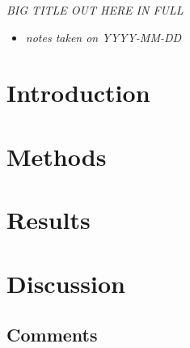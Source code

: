 \documentclass[
]{book}
\providecommand{\tightlist}{%
  \setlength{\itemsep}{0pt}\setlength{\parskip}{0pt}}
\begin{document}

\emph{BIG TITLE OUT HERE IN FULL} \citep{schuchmannsiemers2010a}

\begin{itemize}
\tightlist
\item
  \emph{notes taken on YYYY-MM-DD}
\end{itemize}

\hypertarget{introduction}{%
\section{Introduction}\label{introduction}}

\hypertarget{methods}{%
\section{Methods}\label{methods}}

\hypertarget{results}{%
\section{Results}\label{results}}

\hypertarget{discussion}{%
\section{Discussion}\label{discussion}}

\hypertarget{comments}{%
\subsection{Comments}\label{comments}}

  
\end{document}
